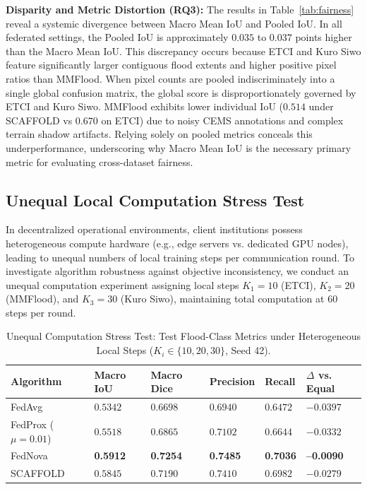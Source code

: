 \documentclass[conference]{IEEEtran}
\begin{document}
\textbf{Disparity and Metric Distortion (RQ3):} The results in Table~\ref{tab:fairness} reveal a systemic divergence between Macro Mean IoU and Pooled IoU. In all federated settings, the Pooled IoU is approximately $0.035$ to $0.037$ points higher than the Macro Mean IoU. This discrepancy occurs because ETCI and Kuro Siwo feature significantly larger contiguous flood extents and higher positive pixel ratios than MMFlood. When pixel counts are pooled indiscriminately into a single global confusion matrix, the global score is disproportionately governed by ETCI and Kuro Siwo. MMFlood exhibits lower individual IoU ($0.514$ under SCAFFOLD vs $0.670$ on ETCI) due to noisy CEMS annotations and complex terrain shadow artifacts. Relying solely on pooled metrics conceals this underperformance, underscoring why Macro Mean IoU is the necessary primary metric for evaluating cross-dataset fairness.

\subsection{Unequal Local Computation Stress Test}
In decentralized operational environments, client institutions possess heterogeneous compute hardware (e.g., edge servers vs. dedicated GPU nodes), leading to unequal numbers of local training steps per communication round. To investigate algorithm robustness against objective inconsistency, we conduct an unequal computation experiment assigning local steps $K_1 = 10$ (ETCI), $K_2 = 20$ (MMFlood), and $K_3 = 30$ (Kuro Siwo), maintaining total computation at 60 steps per round.

\begin{table}[h]
\centering
\caption{Unequal Computation Stress Test: Test Flood-Class Metrics under Heterogeneous Local Steps ($K_i \in \{10, 20, 30\}$, Seed 42).}
\label{tab:unequal}
\small
\begin{tabularx}{\columnwidth}{lYYYYY}
\toprule
\textbf{Algorithm} & \textbf{Macro IoU} & \textbf{Macro Dice} & \textbf{Precision} & \textbf{Recall} & \textbf{$\Delta$ vs. Equal} \\
\midrule
FedAvg & $0.5342$ & $0.6698$ & $0.6940$ & $0.6472$ & $-0.0397$ \\
FedProx ($\mu=0.01$) & $0.5518$ & $0.6865$ & $0.7102$ & $0.6644$ & $-0.0332$ \\
FedNova & \textbf{0.5912} & \textbf{0.7254} & \textbf{0.7485} & \textbf{0.7036} & \textbf{--0.0090} \\
SCAFFOLD & $0.5845$ & $0.7190$ & $0.7410$ & $0.6982$ & $-0.0279$ \\
\bottomrule
\end{tabularx}
\end{table}
\end{document}

